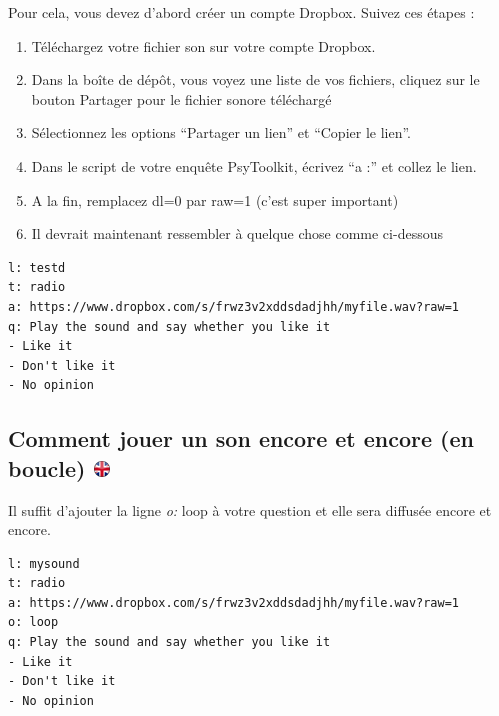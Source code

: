 \documentclass[
]{book}
\providecommand{\tightlist}{%
  \setlength{\itemsep}{0pt}\setlength{\parskip}{0pt}}
\begin{document}
Pour cela, vous devez d'abord créer un compte Dropbox. Suivez ces étapes
:

\begin{enumerate}
\def\labelenumi{\arabic{enumi}.}
\tightlist
\item
  Téléchargez votre fichier son sur votre compte Dropbox.
\item
  Dans la boîte de dépôt, vous voyez une liste de vos fichiers, cliquez
  sur le bouton Partager pour le fichier sonore téléchargé
\item
  Sélectionnez les options ``Partager un lien'' et ``Copier le lien''.
\item
  Dans le script de votre enquête PsyToolkit, écrivez ``a :'' et collez
  le lien.
\item
  A la fin, remplacez dl=0 par raw=1 (c'est super important)
\item
  Il devrait maintenant ressembler à quelque chose comme ci-dessous
\end{enumerate}

\begin{verbatim}
l: testd
t: radio
a: https://www.dropbox.com/s/frwz3v2xddsdadjhh/myfile.wav?raw=1
q: Play the sound and say whether you like it
- Like it
- Don't like it
- No opinion
\end{verbatim}

\hypertarget{comment-jouer-un-son-encore-et-encore-en-boucle}{%
\subsection[Comment jouer un son encore et encore (en boucle)
]{\texorpdfstring{Comment jouer un son encore et encore (en boucle)
\href{https://www.psytoolkit.org/lessons/surveyaudiovideo.html\#_how_to_play_a_sound_again_and_again_loop}{\protect\includegraphics{img/ukflag.png}}}{Comment jouer un son encore et encore (en boucle) }}\label{comment-jouer-un-son-encore-et-encore-en-boucle}}

Il suffit d'ajouter la ligne \emph{o:} loop à votre question et elle
sera diffusée encore et encore.

\begin{verbatim}
l: mysound
t: radio
a: https://www.dropbox.com/s/frwz3v2xddsdadjhh/myfile.wav?raw=1
o: loop
q: Play the sound and say whether you like it
- Like it
- Don't like it
- No opinion
\end{verbatim}
\end{document}
